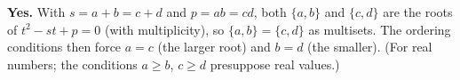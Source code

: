 \textbf{Yes.} With $s=a+b=c+d$ and $p=ab=cd$, both $\{a,b\}$ and $\{c,d\}$ are the roots of $t^2-st+p=0$ (with multiplicity), so $\{a,b\}=\{c,d\}$ as multisets. The ordering conditions then force $a=c$ (the larger root) and $b=d$ (the smaller). (For real numbers; the conditions $a\ge b$, $c\ge d$ presuppose real values.)
